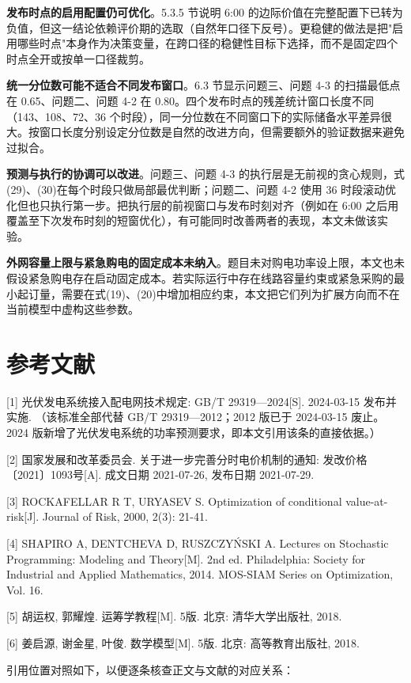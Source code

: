 \documentclass[12pt,a4paper]{ctexart}
\begin{document}
\textbf{发布时点的启用配置仍可优化}。5.3.5 节说明 6:00 的边际价值在完整配置下已转为负值，但这一结论依赖评价期的选取（自然年口径下反号）。更稳健的做法是把"启用哪些时点"本身作为决策变量，在跨口径的稳健性目标下选择，而不是固定四个时点全开或按单一口径裁剪。

\textbf{统一分位数可能不适合不同发布窗口}。6.3 节显示问题三、问题 4-3 的扫描最低点在 0.65、问题二、问题 4-2 在 0.80。四个发布时点的残差统计窗口长度不同（143、108、72、36 个时段），同一分位数在不同窗口下的实际储备水平差异很大。按窗口长度分别设定分位数是自然的改进方向，但需要额外的验证数据来避免过拟合。

\textbf{预测与执行的协调可以改进}。问题三、问题 4-3 的执行层是无前视的贪心规则，式(29)、(30)在每个时段只做局部最优判断；问题二、问题 4-2 使用 36 时段滚动优化但也只执行第一步。把执行层的前视窗口与发布时刻对齐（例如在 6:00 之后用覆盖至下次发布时刻的短窗优化），有可能同时改善两者的表现，本文未做该实验。

\textbf{外网容量上限与紧急购电的固定成本未纳入}。题目未对购电功率设上限，本文也未假设紧急购电存在启动固定成本。若实际运行中存在线路容量约束或紧急采购的最小起订量，需要在式(19)、(20)中增加相应约束，本文把它们列为扩展方向而不在当前模型中虚构这些参数。

\section*{参考文献}

[1] 光伏发电系统接入配电网技术规定: GB/T 29319—2024[S]. 2024-03-15 发布并实施. （该标准全部代替 GB/T 29319—2012；2012 版已于 2024-03-15 废止。2024 版新增了光伏发电系统的功率预测要求，即本文引用该条的直接依据。）

[2] 国家发展和改革委员会. 关于进一步完善分时电价机制的通知: 发改价格〔2021〕1093号[A]. 成文日期 2021-07-26, 发布日期 2021-07-29.

[3] ROCKAFELLAR R T, URYASEV S. Optimization of conditional value-at-risk[J]. Journal of Risk, 2000, 2(3): 21-41.

[4] SHAPIRO A, DENTCHEVA D, RUSZCZYŃSKI A. Lectures on Stochastic Programming: Modeling and Theory[M]. 2nd ed. Philadelphia: Society for Industrial and Applied Mathematics, 2014. MOS-SIAM Series on Optimization, Vol. 16.

[5] 胡运权, 郭耀煌. 运筹学教程[M]. 5版. 北京: 清华大学出版社, 2018.

[6] 姜启源, 谢金星, 叶俊. 数学模型[M]. 5版. 北京: 高等教育出版社, 2018.

引用位置对照如下，以便逐条核查正文与文献的对应关系：
\end{document}
